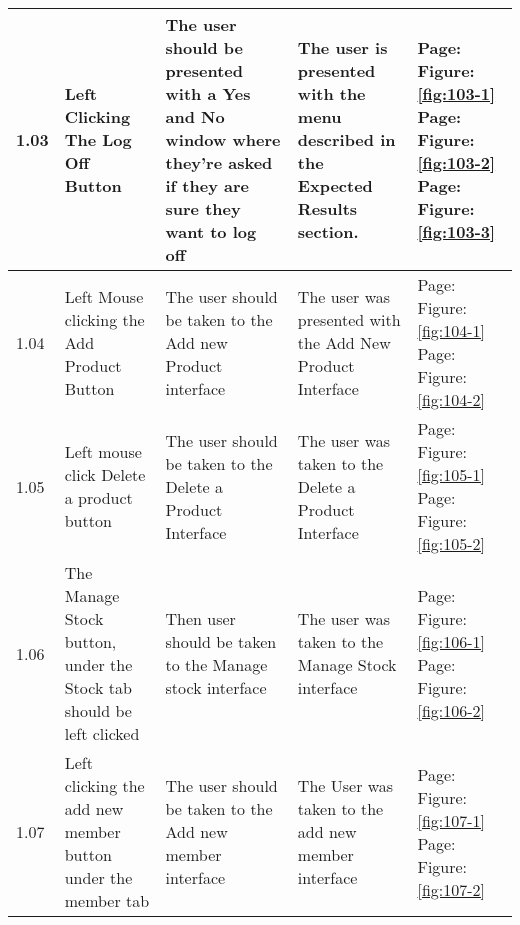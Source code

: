\begin{flushleft}
\begin{longtable}{|p{1.0cm}|p{2.5cm}|p{3cm}|p{3.0cm}|p{2.5cm}|}
	1.03 & Left Clicking The Log Off Button & The user should be presented with a Yes and No window where they're asked if they are sure they want to log off& The user is presented with the menu described in the Expected Results section.&  Page:\pageref{fig:103-1}  \newline Figure:\ref{fig:103-1} \newline  \newline  Page:\pageref{fig:103-2}  \newline Figure:\ref{fig:103-2}  \newline  \newline  Page:\pageref{fig:103-3}  \newline Figure:\ref{fig:103-3}\\ \hline
	1.04 & Left Mouse clicking the Add Product Button & The user should be taken to the Add new Product interface& The user was presented with the Add New Product Interface &  Page:\pageref{fig:104-1}  \newline Figure:\ref{fig:104-1} \newline  \newline Page:\pageref{fig:104-2}  \newline Figure:\ref{fig:104-2}\\ \hline
	1.05 &  Left mouse click Delete a product button& The user should be taken to the Delete a Product Interface & The user was taken to the Delete a Product Interface &  Page:\pageref{fig:105-1}  \newline Figure:\ref{fig:105-1} \newline  \newline Page:\pageref{fig:105-2}  \newline Figure:\ref{fig:105-2} \\ \hline
	1.06 & The Manage Stock button, under the Stock tab should be left clicked & Then user should be taken to the Manage stock interface & The user was taken to the Manage Stock interface &  Page:\pageref{fig:106-1}  \newline Figure:\ref{fig:106-1} \newline  \newline Page:\pageref{fig:106-2}  \newline Figure:\ref{fig:106-2}\\ \hline
	1.07 &  Left clicking the add new member button under the member tab & The user should be taken to the Add new member interface& The User was taken to the add new member interface &  Page:\pageref{fig:107-1}  \newline Figure:\ref{fig:107-1} \newline  \newline Page:\pageref{fig:107-2}  \newline Figure:\ref{fig:107-2} \\ \hline

\end{longtable}
\end{flushleft}
